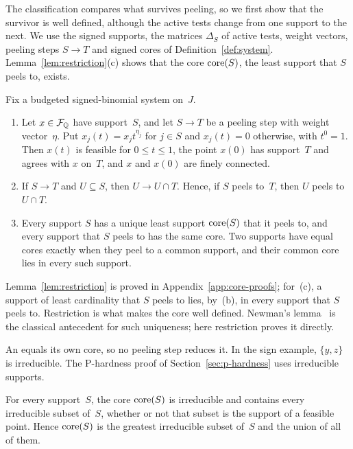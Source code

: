 The classification compares what survives peeling, so we first show that
the survivor is well defined, although the active tests change from one
support to the next. We use the signed supports, the matrices
$\Delta_S$ of active tests, weight vectors, peeling steps $S\to T$ and
signed cores of Definition~\ref{def:system}. Lemma~\ref{lem:restriction}(c)
shows that the core $\operatorname{core}(S)$, the least support that $S$ peels to,
exists.

\begin{lemma}\label{lem:restriction}
Fix a budgeted signed-binomial system on~$J$.
\begin{enumerate}
\item[(a)] Let $x\in\mathcal F_{\mathbb{Q}}$ have support~$S$, and let $S\to T$ be a peeling
step with weight vector~$\eta$. Put $x_j(t)=x_jt^{\eta_j}$ for $j\in S$ and
$x_j(t)=0$ otherwise, with $t^0=1$. Then $x(t)$ is feasible for
$0\le t\le1$, the point $x(0)$ has support~$T$ and agrees with $x$ on~$T$,
and $x$ and $x(0)$ are finely connected.
\item[(b)] If $S\to T$ and $U\subseteq S$, then $U\to U\cap T$. Hence, if
$S$ peels to~$T$, then $U$ peels to $U\cap T$.
\item[(c)] Every support $S$ has a unique least support $\operatorname{core}(S)$ that it
peels to, and every support that $S$ peels to has the same core. Two
supports have equal cores exactly when they peel to a common support, and
their common core lies in every such support.
\end{enumerate}
\end{lemma}

Lemma~\ref{lem:restriction} is proved in Appendix~\ref{app:core-proofs};
for~(c), a support of least cardinality that $S$ peels to lies, by~(b), in
every support that $S$ peels to. Restriction is what makes the core well
defined. Newman's lemma~\cite{newman} is the classical antecedent for such
uniqueness; here restriction proves it directly.

An  equals its own core, so no peeling step
reduces it. In the sign example, $\{y,z\}$ is irreducible. The P-hardness
proof of Section~\ref{sec:p-hardness} uses irreducible supports.

\begin{lemma}\label{lem:irreducible}
For every support~$S$, the core $\operatorname{core}(S)$ is irreducible and contains
every irreducible subset of~$S$, whether or not that subset is the support
of a feasible point. Hence $\operatorname{core}(S)$ is the greatest irreducible subset
of~$S$ and the union of all of them.
\end{lemma}

